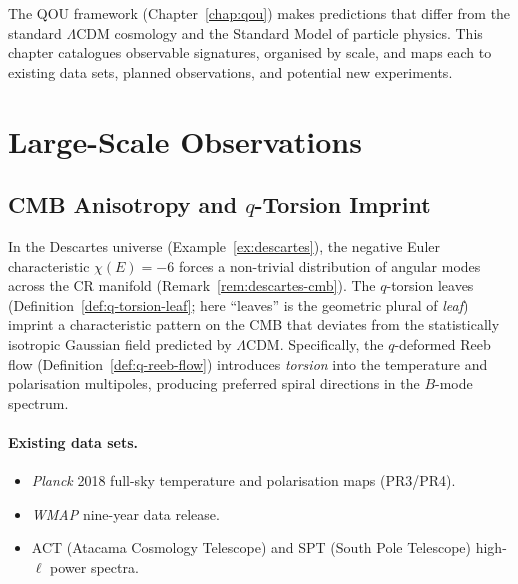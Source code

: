 The QOU framework (Chapter~\ref{chap:qou}) makes predictions that differ from
the standard $\Lambda$CDM cosmology and the Standard Model of particle physics.
This chapter catalogues observable signatures, organised by scale, and maps each
to existing data sets, planned observations, and potential new experiments.


\section{Large-Scale Observations}
\label{sec:large-scale}

\subsection{CMB Anisotropy and $q$-Torsion Imprint}
\label{sec:cmb-torsion}

\begin{remark}
\label{rem:cmb-q-torsion}
In the Descartes universe (Example~\ref{ex:descartes}), the negative Euler
characteristic $\chi(E) = -6$ forces a non-trivial distribution of angular
modes across the CR manifold (Remark~\ref{rem:descartes-cmb}).  The
$q$-torsion leaves (Definition~\ref{def:q-torsion-leaf}; here ``leaves'' is the
geometric plural of \emph{leaf}) imprint a
characteristic pattern on the CMB that deviates from the statistically
isotropic Gaussian field predicted by $\Lambda$CDM\@.  Specifically, the
$q$-deformed Reeb flow (Definition~\ref{def:q-reeb-flow}) introduces
\emph{torsion} into the temperature and polarisation multipoles, producing
preferred spiral directions in the $B$-mode spectrum.
\end{remark}

\paragraph{Existing data sets.}
\begin{itemize}
  \item \emph{Planck} 2018 full-sky temperature and polarisation maps
        (PR3/PR4).
  \item \emph{WMAP} nine-year data release.
  \item ACT (Atacama Cosmology Telescope) and SPT (South Pole Telescope)
        high-$\ell$ power spectra.
\end{itemize}

